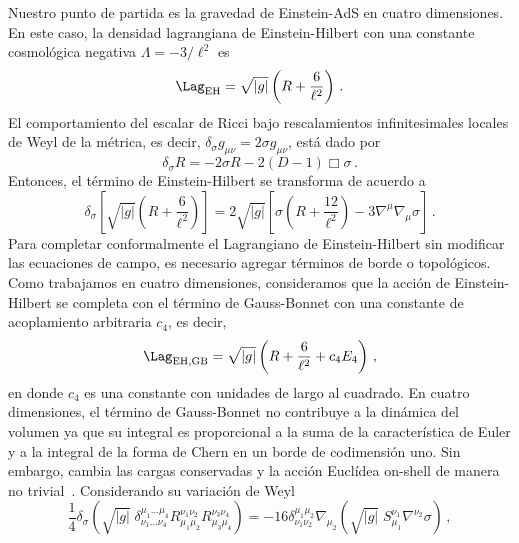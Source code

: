 \documentclass[../Main.tex]{subfiles}
\begin{document}
Nuestro punto de partida es la gravedad de Einstein-AdS en cuatro dimensiones. En este caso, la densidad lagrangiana de Einstein-Hilbert con una constante cosmológica negativa $\Lambda=-3/\ell^2$ es
\begin{equation}
\Lag_{\rm EH}= \sqrt{|g|} \left(R+\frac{6}{\ell^2}\right) \, .
\end{equation}
El comportamiento del escalar de Ricci bajo rescalamientos infinitesimales locales de Weyl de la métrica, es decir, $\delta_{\sigma} g_{\mu \nu} = 2 \sigma g_{\mu \nu}$, está dado por
\begin{equation}
\delta_{\sigma} R = -2 \sigma R - 2\left(D-1\right) \Box \sigma \, .
\end{equation}
Entonces, el término de Einstein-Hilbert se transforma de acuerdo a
\begin{equation}
\delta_{\sigma} \left[\sqrt{|g|} \left(R + \frac{6}{\ell^2} \right)\right]
=2 \sqrt{|g|} \left [\sigma \left(R +\frac{12}{\ell ^{2}}\right) -3 \nabla ^{\mu } \nabla _{\mu }\sigma \right ] \, . \label{LEH4D}
\end{equation}
Para completar conformalmente el Lagrangiano de Einstein-Hilbert sin modificar las ecuaciones de campo, es necesario agregar términos de borde o topológicos. Como trabajamos en cuatro dimensiones, consideramos que la acción de Einstein-Hilbert se completa con el término de Gauss-Bonnet con una constante de acoplamiento arbitraria $c_4$, es decir,
\begin{equation}\label{LagEHGB}
\Lag_{\rm EH,GB} = \sqrt{|g|} \left(R+\frac{6}{\ell^2} + c_{4} E_{4}\right) \,,
\end{equation}
en donde $c_4$ es una constante con unidades de largo al cuadrado. En cuatro dimensiones, el término de Gauss-Bonnet no contribuye a la dinámica del volumen ya que su integral es proporcional a la suma de la característica de Euler y a la integral de la forma de Chern en un borde de codimensión uno. Sin embargo, cambia las cargas conservadas y la acción Euclídea on-shell de manera no trivial~\cite{Aros:1999id,Aros:1999kt,Miskovic:2009bm}. Considerando su variación de Weyl 
\begin{equation}
\dfrac{1}{4} \delta _{\sigma } \left(\sqrt{|g|} \;\delta _{\nu _{1} \ldots  \nu _{4}}^{\mu _{1} \ldots \mu _{4}} R_{\mu _{1} \mu _{2}}^{\nu _{1} \nu _{2}} R_{\mu _{3} \mu _{4}}^{\nu _{3} \nu _{4}}\right)
= -16 \delta _{\nu _{1} \nu _{2}}^{\mu _{1} \mu _{2}}  \nabla _{\mu _{2}}\left (\sqrt{|g|} \;S_{\mu _{1}}^{\nu _{1}}  \nabla ^{\nu _{2}}\sigma \right ) \,, \label{weylvarGB}
\end{equation}
\end{document}
